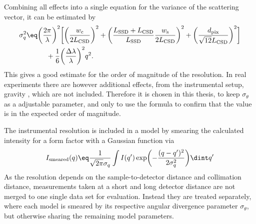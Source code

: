 \documentclass[\main/dresen_thesis.tex]{subfiles}
\begin{document}
    Combining all effects into a single equation for the variance of the scattering vector, it can be estimated by
    \begin{align}
      \begin{split}
        \sigma_q^2
        &\eq
          \biggl( \frac{2\pi}{\lambda} \biggr)^2 \biggl[ \biggl( \frac{w_\mathrm{c}}{2 L_\mathrm{CSD}} \biggr)^2 +
          \biggl( \frac{L_\mathrm{SSD} + L_\mathrm{CSD}}{L_\mathrm{SSD}} \frac{w_\mathrm{s}}{2 L_\mathrm{CSD}} \biggr)^2 +
          \biggl( \frac{d_\mathrm{pix}}{\sqrt{12} L_\mathrm{CSD}} \biggr)^2 \biggr] \\
        &\hspace{1cm}+ \frac{1}{6} \biggl( \frac{\Delta \lambda}{\lambda} \biggr)^2 q^2 .
      \end{split}
    \end{align}
    This gives a good estimate for the order of magnitude of the resolution.
    In real experiments there are however additional effects, from the instrumental setup, gravity \etc, which are not included.
    Therefore it is chosen in this thesis, to keep $\sigma_\theta$ as a adjustable parameter, and only to use the formula to confirm that the value is in the expected order of magnitude.

    The instrumental resolution is included in a model by smearing the calculated intensity for a form factor with a Gaussian function via
    \begin{align}
      I_\mathrm{smeared} (q) \eq \frac{1}{\sqrt{2 \pi}\sigma_q}  \int I(q^\prime) \exp\biggl(-\frac{(q - q^\prime)^2}{2 \sigma_q^2}\biggr)\dint q^\prime
    \end{align}
    As the resolution depends on the sample-to-detector distance and collimation distance, measurements taken at a short and long detector distance are not merged to one single data set for evaluation.
    Instead they are treated separately, where each model is smeared by its respective angular divergence parameter $\sigma_\theta$, but otherwise sharing the remaining model parameters.
\end{document}

